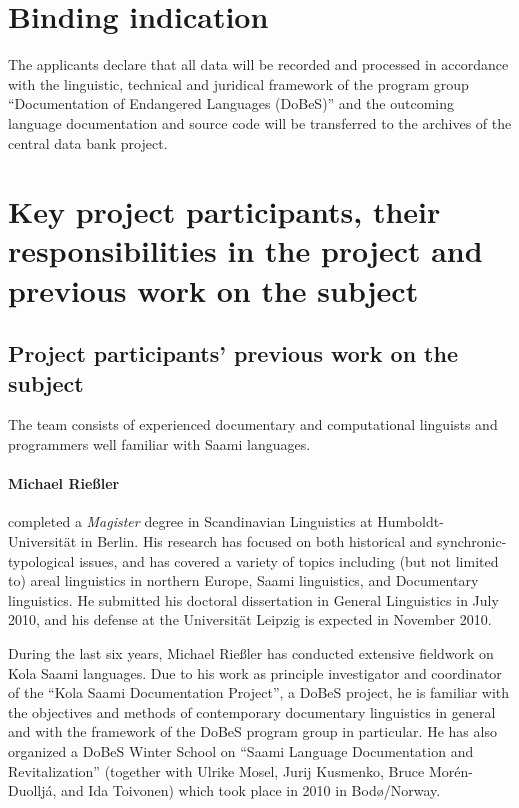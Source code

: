 \documentclass[a4paper,12pt]{article}
\begin{document}
{{{{\section{Binding indication}

The applicants declare that all data will be recorded and processed in accordance with the linguistic, technical and juridical framework of the program group “Documentation of Endangered Languages (DoBeS)” and the outcoming language documentation and source code will be transferred to the archives of the central data bank project.

\section{Key project participants, their responsibilities in the project and previous work on the subject}

\subsection{Project participants' previous work on the subject}
The team consists of experienced documentary and computational linguists and programmers well familiar with Saami languages.

\paragraph{Michael Rießler} completed a \textit{Magister} degree in Scandinavian Linguistics at Humboldt-Universität in Berlin. His research has focused on both historical and synchronic-typological issues, and has covered a variety of topics including (but not limited to) areal linguistics in northern Europe, Saami linguistics, and Documentary linguistics. He submitted his doctoral dissertation in General Linguistics in July 2010, and his defense at the Universität Leipzig is expected in November 2010.

During the last six years, Michael Rießler has conducted extensive fieldwork on Kola Saami languages. Due to his work as principle investigator and coordinator of the “Kola Saami Documentation Project”, a DoBeS project, he is familiar with the objectives and methods of contemporary documentary linguistics in general and with the framework of the DoBeS program group in particular. He has also organized a DoBeS Winter School on “Saami Language Documentation and Revitalization” (together with Ulrike Mosel, Jurij Kusmenko, Bruce Morén-Duolljá, and Ida Toivonen) which took place in 2010 in Bodø/Norway.

}}}}
\end{document}
